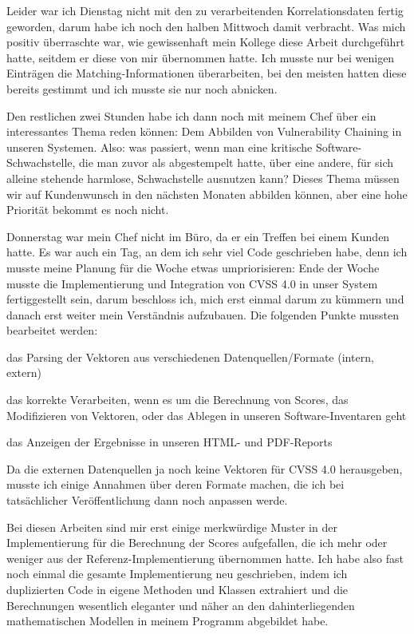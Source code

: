Leider war ich Dienstag nicht mit den zu verarbeitenden Korrelationsdaten fertig geworden, darum habe ich noch den halben Mittwoch damit verbracht.
Was mich positiv überraschte war, wie gewissenhaft mein Kollege diese Arbeit durchgeführt hatte, seitdem er diese von mir übernommen hatte.
Ich musste nur bei wenigen Einträgen die Matching-Informationen überarbeiten, bei den meisten hatten diese bereits gestimmt und ich musste sie nur noch abnicken.

Den restlichen zwei Stunden habe ich dann noch mit meinem Chef über ein interessantes Thema reden können: Dem Abbilden von Vulnerability Chaining in unseren Systemen.
Also: was passiert, wenn man eine kritische Software-Schwachstelle, die man zuvor als  abgestempelt hatte, über eine andere, für sich alleine stehende harmlose, Schwachstelle ausnutzen kann?
Dieses Thema müssen wir auf Kundenwunsch in den nächsten Monaten abbilden können, aber eine hohe Priorität bekommt es noch nicht.

Donnerstag war mein Chef nicht im Büro, da er ein Treffen bei einem Kunden hatte.
Es war auch ein Tag, an dem ich sehr viel Code geschrieben habe, denn ich musste meine Planung für die Woche etwas umpriorisieren:
Ende der Woche musste die Implementierung und Integration von CVSS 4.0 in unser System fertiggestellt sein, darum beschloss ich, mich erst einmal darum zu kümmern und danach erst weiter mein Verständnis aufzubauen.
Die folgenden Punkte mussten bearbeitet werden:

\begin{smitemize}
    \item das Parsing der Vektoren aus verschiedenen Datenquellen/Formate (intern, extern)
    \item das korrekte Verarbeiten, wenn es um die Berechnung von Scores, das Modifizieren von Vektoren, oder das Ablegen in unseren Software-Inventaren geht
    \item das Anzeigen der Ergebnisse in unseren HTML- und PDF-Reports
\end{smitemize}

Da die externen Datenquellen ja noch keine Vektoren für CVSS 4.0 herausgeben, musste ich einige Annahmen über deren Formate machen, die ich bei tatsächlicher Veröffentlichung dann noch anpassen werde.

Bei diesen Arbeiten sind mir erst einige merkwürdige Muster in der Implementierung für die Berechnung der Scores aufgefallen, die ich mehr oder weniger aus der Referenz-Implementierung übernommen hatte.
Ich habe also fast noch einmal die gesamte Implementierung neu geschrieben, indem ich duplizierten Code in eigene Methoden und Klassen extrahiert und die Berechnungen wesentlich eleganter und näher an den dahinterliegenden mathematischen Modellen in meinem Programm abgebildet habe.

